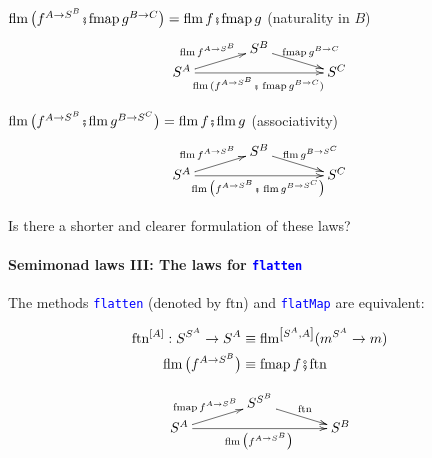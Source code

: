 {\footnotesize{}$\text{flm}\,\big(f^{A\rightarrow S^{B}}\bef\text{fmap}\,g^{B\rightarrow C}\big)=\text{flm}\,f\bef\text{fmap}\,g$}
{\footnotesize{}(naturality in $B$)} {\footnotesize{}
\[
\xymatrix{\xyScaleY{0.2pc}\xyScaleX{3pc} & S^{B}\ar[rd]\sp(0.5){\ \text{fmap}\,g^{B\rightarrow C}}\\
S^{A}\ar[ru]\sp(0.5){\text{flm}\,f^{A\rightarrow S^{B}}\ }\ar[rr]\sb(0.5){\text{flm}\,(f^{A\rightarrow S^{B}}\bef\,\text{fmap}\,g^{B\rightarrow C})\,} &  & S^{C}
}
\]
}{\footnotesize\par}

{\footnotesize{}$\text{flm}\,\big(f^{A\rightarrow S^{B}}\bef\text{flm}\,g^{B\rightarrow S^{C}}\big)=\text{flm}\,f\bef\text{flm}\,g$}
{\footnotesize{}(associativity)} {\footnotesize{}
\[
\xymatrix{\xyScaleY{0.2pc}\xyScaleX{3pc} & S^{B}\ar[rd]\sp(0.5){\ \text{flm}\,g^{B\rightarrow S^{C}}}\\
S^{A}\ar[ru]\sp(0.5){\text{flm}\,f^{A\rightarrow S^{B}}\ }\ar[rr]\sb(0.5){\text{flm}\,\big(f^{A\rightarrow S^{B}}\bef\,\text{flm}\,g^{B\rightarrow S^{C}}\big)\,} &  & S^{C}
}
\]
}{\footnotesize\par}

Is there a shorter and clearer formulation of these laws?


\paragraph{Semimonad laws III: The laws for \texttt{\textcolor{blue}{\footnotesize{}flatten}} }

The methods \texttt{\textcolor{blue}{\footnotesize{}flatten}} (denoted
by {\footnotesize{}$\text{ftn}$}) and \texttt{\textcolor{blue}{\footnotesize{}flatMap}}
are equivalent:\texttt{\textcolor{blue}{\footnotesize{} }}%
\begin{minipage}[c][1\totalheight][t]{0.4\columnwidth}%
{\footnotesize{}
\begin{align*}
\text{ftn}^{\left[A\right]}:S^{S^{A}}\rightarrow S^{A} & \equiv\text{flm}^{\left[S^{A},A\right]}(m^{S^{A}}\rightarrow m)\\
\text{flm}\,\big(f^{A\rightarrow S^{B}}\big) & \equiv\text{fmap}\,f\bef\text{ftn}
\end{align*}
}%
\end{minipage}\texttt{\textcolor{blue}{\footnotesize{}\hfill{}}}%
\begin{minipage}[c][1\totalheight][t]{0.4\columnwidth}%
{\footnotesize{}
\[
\xymatrix{\xyScaleY{0.2pc}\xyScaleX{3pc} & S^{S^{B}}\ar[rd]\sp(0.5){\ \text{ftn}\ }\\
S^{A}\ar[ru]\sp(0.5){\text{fmap}\,f^{A\rightarrow S^{B}}\ }\ar[rr]\sb(0.5){\text{flm}\,\big(f^{A\rightarrow S^{B}}\big)\,} &  & S^{B}
}
\]
}%
\end{minipage}\texttt{\textcolor{blue}{\footnotesize{}\  \  \ \hfill{}}}{\footnotesize\par}

